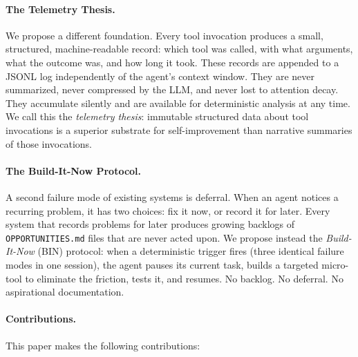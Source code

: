 \documentclass[11pt]{article}
\begin{document}
\paragraph{The Telemetry Thesis.}
We propose a different foundation. Every tool invocation produces a small,
structured, machine-readable record: which tool was called, with what arguments,
what the outcome was, and how long it took. These records are appended to a
JSONL log independently of the agent's context window. They are never
summarized, never compressed by the LLM, and never lost to attention decay.
They accumulate silently and are available for deterministic analysis at any
time. We call this the \emph{telemetry thesis}: immutable structured data about
tool invocations is a superior substrate for self-improvement than narrative
summaries of those invocations.

\paragraph{The Build-It-Now Protocol.}
A second failure mode of existing systems is deferral. When an agent notices a
recurring problem, it has two choices: fix it now, or record it for later. Every
system that records problems for later produces growing backlogs of
\texttt{OPPORTUNITIES.md} files that are never acted upon. We propose instead
the \emph{Build-It-Now} (BIN) protocol: when a deterministic trigger fires
(three identical failure modes in one session), the agent pauses its current
task, builds a targeted micro-tool to eliminate the friction, tests it, and
resumes. No backlog. No deferral. No aspirational documentation.

\paragraph{Contributions.}
This paper makes the following contributions:
\end{document}
